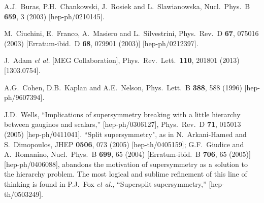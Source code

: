 \documentclass[12pt]{article}
\begin{document}
\begin{thebibliography}{999}
A.J.~Buras, P.H.~Chankowski, J.~Rosiek and L.~Slawianowska,
  Nucl.\ Phys.\ B {\bf 659}, 3 (2003)
  [hep-ph/0210145].

M.~Ciuchini, E.~Franco, A.~Masiero and L.~Silvestrini,
  Phys.\ Rev.\ D {\bf 67}, 075016 (2003)
  [Erratum-ibid.\ D {\bf 68}, 079901 (2003)]
  [hep-ph/0212397].

J.~Adam {\it et al.} [MEG Collaboration],
  Phys.\ Rev.\ Lett.\  {\bf 110}, 201801 (2013)
  [1303.0754].
%

A.G.~Cohen, D.B.~Kaplan and A.E.~Nelson,
  Phys.\ Lett.\ B {\bf 388}, 588 (1996)
  [hep-ph/9607394].

J.D.~Wells,
  ``Implications of supersymmetry breaking with a little hierarchy between
  gauginos and scalars,''
  [hep-ph/0306127],
  Phys.\ Rev.\ D {\bf 71}, 015013 (2005)
  [hep-ph/0411041].
``Split supersymmetry", as in 
N.~Arkani-Hamed and S.~Dimopoulos,
  JHEP {\bf 0506}, 073 (2005)
  [hep-th/0405159];
G.F.~Giudice and A.~Romanino,
  Nucl.\ Phys.\ B {\bf 699}, 65 (2004)
  [Erratum-ibid.\ B {\bf 706}, 65 (2005)]
  [hep-ph/0406088],
abandons the motivation of supersymmetry as
a solution to the hierarchy problem. The most logical and
sublime refinement of this line of thinking is found in
P.J.~Fox {\it et al.},
  ``Supersplit supersymmetry,''
  [hep-th/0503249].


\end{thebibliography}
\end{document}
